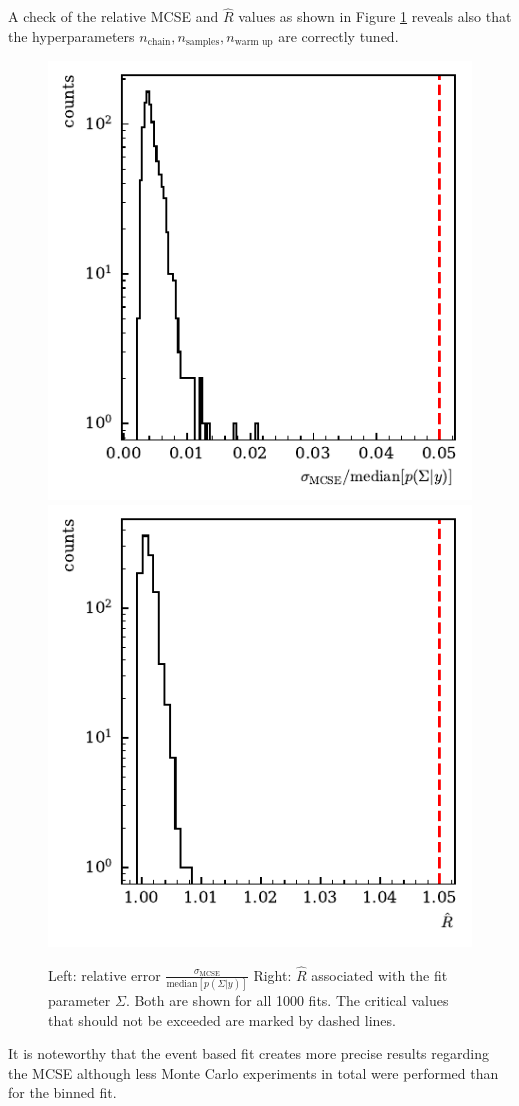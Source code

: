  A check of the relative MCSE and $\widehat{R}$ values as shown in Figure \ref{fig:toyMC_diagnostics1} reveals also that the hyperparameters $n_\text{chain},n_\text{samples},n_\text{warm up}$ are correctly tuned.
 \begin{figure}[htbp]
 	\includegraphics[width=.49\linewidth]{../bayes/event_based_fit/plots/toyMC_mcse_hist.pdf}
 	\includegraphics[width=.49\linewidth]{../bayes/event_based_fit/plots/toyMC_rhat_hist.pdf}
 	\caption{ Left: relative error $\frac{\sigma_\text{MCSE}}{\text{median}\left[p\left(\Sigma|y\right)\right]}$ Right: $\widehat{R}$ associated with the fit parameter $\Sigma$. Both are shown for all 1000 fits. The critical values that should not be exceeded are marked by dashed lines.}
 	\label{fig:toyMC_diagnostics1}
 \end{figure}
It is noteworthy that the event based fit creates more precise results regarding the MCSE although less Monte Carlo experiments in total were performed than for the binned fit. 

